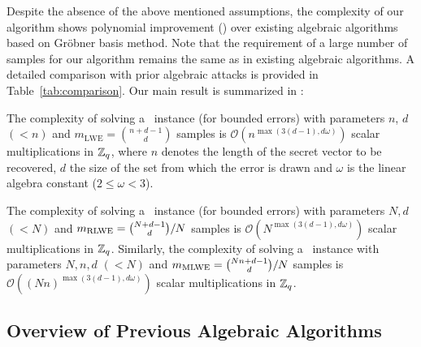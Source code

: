Despite the absence of the above mentioned assumptions, the complexity of our algorithm shows polynomial improvement () over existing algebraic algorithms based on Gr\"obner basis method. Note that the requirement of a large number of samples for our algorithm remains the same as in existing algebraic algorithms. A detailed comparison with prior algebraic attacks is provided in Table~\ref{tab:comparison}.
Our main result is summarized in :

\begin{theorem}\label{thm:result}
The complexity of solving a \slwe\ instance (for bounded errors) with parameters $n$, $d$ $(<n)$ and $m_{\text{LWE}} = \binom{n+d-1}{d}$ samples is $\mathcal{O}\!\left(n^{\max(3(d-1), d\omega)}\right)$ scalar multiplications in $\mathbb{Z}_q$, where $n$ denotes the length of the secret vector to be recovered, $d$ the size of the set from which the error is drawn and $\omega$ is the linear algebra constant ($2 \le \omega < 3$).
\end{theorem}

\begin{corollary}
    \label{cor:result-rlwe-mlwe}
The complexity of solving a \rlwe\ instance (for bounded errors) with parameters $N, d$ $(<N)$ and $m_{\text{RLWE}} = \binom{N+d-1}{d}/N$ samples is $\mathcal{O}\!\left(N^{\max(3(d-1), d\omega)}\right)$ scalar multiplications in $\mathbb{Z}_q$. Similarly, the complexity of solving a \mlwe\ instance with parameters $N, n, d$ $(<N)$ and $m_{\text{MLWE}} = \binom{Nn+d-1}{d}/N$ samples is $\mathcal{O}\!\left({(Nn)}^{\max(3(d-1), d\omega)}\right)$ scalar multiplications in $\mathbb{Z}_q$.
\end{corollary}



\subsection{Overview of Previous Algebraic Algorithms}
\label{subsec:previous-algorithms}

